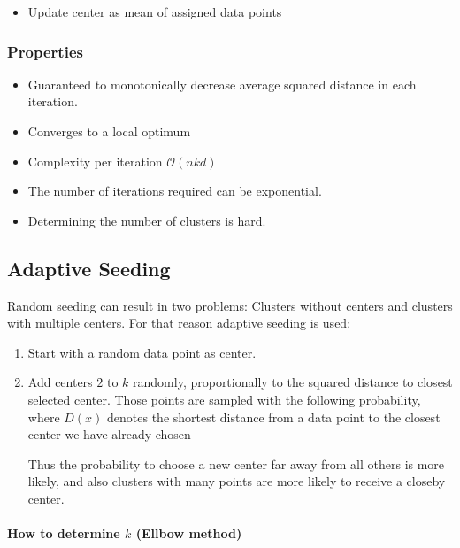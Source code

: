\documentclass[10pt,a4paper]{scrartcl}
\begin{document}
\begin{multicols*}{2}
\begin{enumerate}
\begin{itemize}
\item Update center as mean of assigned data points
\end{itemize}
\end{enumerate}

\subsubsection{Properties}

\begin{itemize}
\item Guaranteed to monotonically decrease average squared distance in each iteration.
\item Converges to a local optimum
\item Complexity per iteration $\mathcal{O}(nkd)$
\item The number of iterations required can be exponential.
\item Determining the number of clusters is hard.
\end{itemize}

\subsection{Adaptive Seeding}

Random seeding can result in two problems: Clusters without centers and clusters with multiple centers. For that reason adaptive seeding is used:

\begin{enumerate}
\item Start with a random data point as center.
\item Add centers $2$ to $k$ randomly, proportionally to the squared distance to closest selected center. Those points are sampled with the following probability, where $D(x)$ denotes the shortest distance from a data point to the closest center we have already chosen


Thus the probability to choose a new center far away from all others is more likely, and also clusters with many points are more likely to receive a closeby center.
\end{enumerate}

\paragraph{How to determine $k$ (Ellbow method)}


\end{multicols*}
\end{document}
